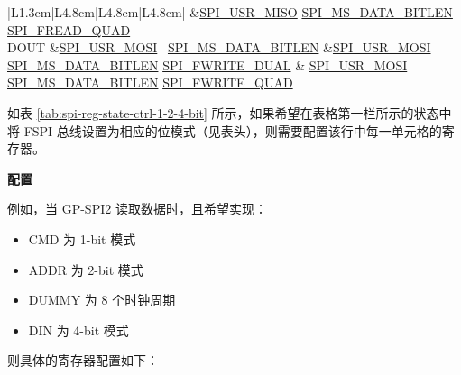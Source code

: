 \documentclass[main\_\_CN.tex]{subfiles}
\begin{document}
\begin{longtable}[c]{ |L{1.3cm}|L{4.8cm}|L{4.8cm}|L{4.8cm}| }
     &\hyperref[fielddesc:SPIUSRMISO]{SPI\_USR\_MISO}
     \hyperref[fielddesc:SPIMSDATABITLEN]{SPI\_MS\_DATA\_BITLEN}
    \hyperref[fielddesc:SPIFREADQUAD]{SPI\_FREAD\_QUAD}\\
     \hline
DOUT &\hyperref[fielddesc:SPIUSRMOSI]{SPI\_USR\_MOSI}       \
      \hyperref[fielddesc:SPIMSDATABITLEN]{SPI\_MS\_DATA\_BITLEN}
     &\hyperref[fielddesc:SPIUSRMOSI]{SPI\_USR\_MOSI}
     \hyperref[fielddesc:SPIMSDATABITLEN]{SPI\_MS\_DATA\_BITLEN}      \hyperref[fielddesc:SPIFWRITEDUAL]{SPI\_FWRITE\_DUAL} &
    \hyperref[fielddesc:SPIUSRMOSI]{SPI\_USR\_MOSI}
     \hyperref[fielddesc:SPIMSDATABITLEN]{SPI\_MS\_DATA\_BITLEN}      \hyperref[fielddesc:SPIFWRITEQUAD]{SPI\_FWRITE\_QUAD} \\
     \hline
\end{longtable}

如表 \ref{tab:spi-reg-state-ctrl-1-2-4-bit} 所示，如果希望在表格第一栏所示的状态中将 FSPI 总线设置为相应的位模式（见表头），则需要配置该行中每一单元格的寄存器。

\textbf{配置}

例如，当 GP-SPI2 读取数据时，且希望实现：
\begin{itemize}
    \item CMD 为 1-bit 模式
    \item ADDR 为 2-bit 模式
    \item DUMMY 为 8 个时钟周期
    \item DIN 为 4-bit 模式
\end{itemize}
则具体的寄存器配置如下：
\end{document}

